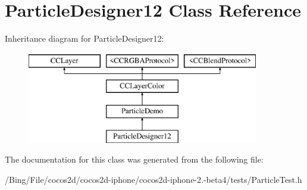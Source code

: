 \hypertarget{interface_particle_designer12}{\section{Particle\-Designer12 Class Reference}
\label{interface_particle_designer12}
}
Inheritance diagram for Particle\-Designer12\-:\begin{figure}[H]
\begin{center}
\leavevmode
\includegraphics[height=4.000000cm]{interface_particle_designer12}
\end{center}
\end{figure}


The documentation for this class was generated from the following file\-:\begin{DoxyCompactItemize}
\item 
/\-Bing/\-File/cocos2d/cocos2d-\/iphone/cocos2d-\/iphone-\/2.-\/beta4/tests/Particle\-Test.\-h\end{DoxyCompactItemize}
